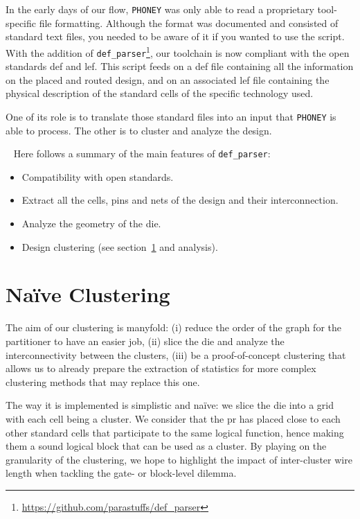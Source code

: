 \documentclass[11pt,a4paper]{report} %
\theoremstyle{customdef}
\begin{document}
In the early days of our flow, \texttt{PHONEY} was only able to read a proprietary tool-specific file formatting.
Although the format was documented and consisted of standard text files, you needed to be aware of it if you wanted to use the script.
With the addition of \texttt{def\_parser}\footnote{\url{https://github.com/parastuffs/def_parser}}, our toolchain is now compliant with the open standards \gls{def} and \gls{lef}.
This script feeds on a \gls{def} file containing all the information on the placed and routed design, and on an associated \gls{lef} file containing the physical description of the standard cells of the specific technology used.

One of its role is to translate those standard files into an input that \texttt{PHONEY} is able to process.
The other is to cluster and analyze the design.

~\newline{}
Here follows a summary of the main features of \texttt{def\_parser}:
\begin{itemize}
	\item Compatibility with open standards.
	\item Extract all the cells, pins and nets of the design and their interconnection.
	\item Analyze the geometry of the die.
	\item Design clustering (see section~\ref{sec:clustering} and analysis).
\end{itemize}


\section{Naïve Clustering}\label{sec:clustering}

The aim of our clustering is manyfold: (i) reduce the order of the graph for the partitioner to have an easier job, (ii) slice the die and analyze the interconnectivity between the clusters, (iii) be a proof-of-concept clustering that allows us to already prepare the extraction of statistics for more complex clustering methods that may replace this one.

The way it is implemented is simplistic and naïve: we slice the die into a grid with each cell being a cluster.
We consider that the \gls{pr} has placed close to each other standard cells that participate to the same logical function, hence making them a sound logical block that can be used as a cluster.
By playing on the granularity of the clustering, we hope to highlight the impact of inter-cluster wire length when tackling the gate- or block-level dilemma.
\end{document}
